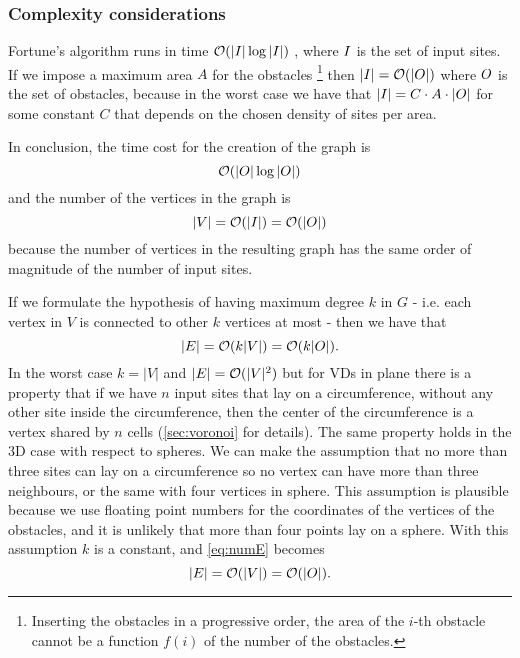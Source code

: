 \documentclass[dissertation.tex]{subfiles}
\begin{document}
\subsubsection{Complexity considerations}
Fortune's algorithm runs in time $\mathcal{O}(|I|\log |I|)$ \cite{deberg},
where $I$ is
the set 
of input sites. If we impose a maximum area $A$ for the obstacles
\footnote{Inserting the obstacles in a progressive order, the area of the $i$-th
obstacle cannot be a function $f(i)$ of the number of
the obstacles.} then $|I|=\mathcal{O}(|O|)$ where $O$ is the set of
obstacles, because in the worst case we have that $|I|=C\cdot A\cdot
|O|$ for
some constant $C$ that depends on the chosen density of sites per area.

In conclusion, the time cost for the creation of the graph
is
\newcommand{\eqCostGraph}{\ensuremath{\bigO(|\obsSet|\log |\obsSet|)}}
\begin{equation}
  \label{eq:costGraph}
  \eqCostGraph
\end{equation}
and the number of the vertices in the graph
is 
\begin{equation}
  \label{eq:numV}
  |V|=\mathcal{O}(|I|)=\mathcal{O}(|O|)
\end{equation}
because the number of vertices in the resulting graph has the
same order of magnitude of the number of input sites.

If we formulate the hypothesis of having maximum degree $k$ in $G$ -
i.e. each vertex in $V$ is connected to other $k$ vertices at most -
then we have that
\begin{equation}
  \label{eq:numE}
  |E|=\mathcal{O}(k|V|)=\mathcal{O}(k|O|).
\end{equation}
In the worst case $k=|V|$ and $|E|=\mathcal{O}(|V|^2)$ but for \acp{VD} in
plane there is a property that if we have $n$ input sites
that lay on a circumference, without any other site inside the
circumference, then the center of the circumference is a vertex shared
by $n$ cells (\cref{sec:voronoi} for details). The same property holds
in the 3D case with respect to spheres. We can make the assumption that no more than three sites can lay
on a circumference so no vertex can have more than three neighbours,
or the same with four vertices in sphere. This assumption is
plausible because we use floating point numbers for the coordinates of
the vertices of the obstacles, and it is unlikely that more than
four points lay on a sphere. With this assumption $k$ is a constant,
and \cref{eq:numE} becomes
\begin{equation*}
  |E|=\mathcal{O}(|V|)=\mathcal{O}(|O|).
\end{equation*}
\end{document}
